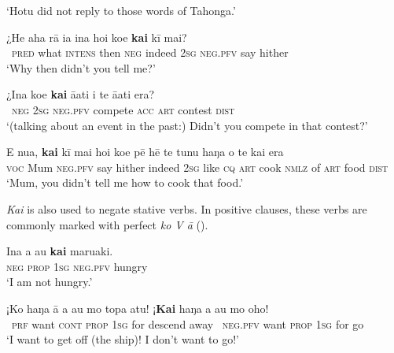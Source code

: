 \glt 
‘Hotu did not reply to those words of Tahonga.’ \textstyleExampleref{[R301.273]} 
\z

\ea\label{ex:10.117}
\gll ¿He aha rā ia {\ꞌ}ina ho{\ꞌ}i koe \textbf{kai} kī mai? \\
~\textsc{pred} what \textsc{intens} then \textsc{neg} indeed \textsc{2sg} \textsc{neg.pfv} say hither \\

\glt 
‘Why then didn’t you tell me?’ \textstyleExampleref{[R372.050]} 
\z

\ea\label{ex:10.118}
\gll ¿{\ꞌ}Ina koe \textbf{kai} {\ꞌ}ā{\ꞌ}ati i te {\ꞌ}ā{\ꞌ}ati era? \\
~\textsc{neg} \textsc{2sg} \textsc{neg.pfv} compete \textsc{acc} \textsc{art} contest \textsc{dist} \\

\glt 
‘(talking about an event in the past:) Didn’t you compete in that contest?’ \textstyleExampleref{[R415.738]} 
\z

\ea\label{ex:10.119}
\gll E nua, \textbf{kai} kī mai ho{\ꞌ}i koe pē hē te tunu haŋa o te kai era \\
\textsc{voc} Mum \textsc{neg.pfv} say hither indeed \textsc{2sg} like \textsc{cq} \textsc{art} cook \textsc{nmlz} of \textsc{art} food \textsc{dist} \\

\glt 
‘Mum, you didn’t tell me how to cook that food.’ \textstyleExampleref{[R236.091]} 
\z

\textit{Kai} is also used to negate stative verbs. In positive clauses, these verbs are commonly marked with perfect  \textit{ko V {\ꞌ}ā} ().

\ea\label{ex:10.120}
\gll {\ꞌ}Ina a au \textbf{kai} maruaki. \\
\textsc{neg} \textsc{prop} \textsc{1sg} \textsc{neg.pfv} hungry \\

\glt 
‘I am not hungry.’ \textstyleExampleref{[R208.250]} 
\z

\ea\label{ex:10.121}
\gll ¡Ko haŋa {\ꞌ}ā a au mo topa atu! ¡\textbf{Kai} haŋa a au mo oho!  \\
~\textsc{prf} want \textsc{cont} \textsc{prop} \textsc{1sg} for descend away ~\textsc{neg.pfv} want \textsc{prop} \textsc{1sg} for go  \\

\glt 
‘I want to get off (the ship)! I don’t want to go!’ \textstyleExampleref{[R210.106–107]}
\z

